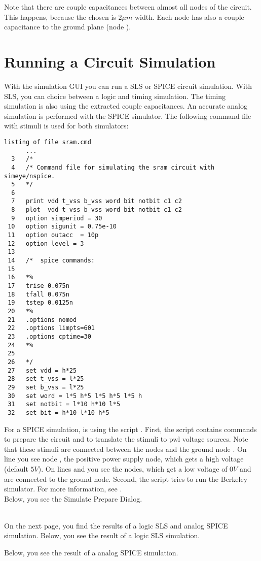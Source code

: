 Note that there are couple capacitances between almost all nodes of the circuit.
This happens, because the chosen  is $2 \mu m$ width.
Each node has also a couple capacitance to the ground plane (node ).

\section{Running a Circuit Simulation}
With the simulation GUI  you can run a SLS or SPICE circuit simulation.
With SLS, you can choice between a logic and timing simulation.
The timing simulation is also using the extracted couple capacitances.
An accurate analog simulation is performed with the SPICE simulator.
The following command file with stimuli is used for both simulators:

\small \begin{Verbatim}[frame=single]
listing of file sram.cmd
      ...
  3   /*
  4   /* Command file for simulating the sram circuit with simeye/nspice.
  5   */
  6
  7   print vdd t_vss b_vss word bit notbit c1 c2
  8   plot  vdd t_vss b_vss word bit notbit c1 c2
  9   option simperiod = 30
 10   option sigunit = 0.75e-10
 11   option outacc  = 10p
 12   option level = 3
 13
 14   /*  spice commands:
 15
 16   *%
 17   trise 0.075n
 18   tfall 0.075n
 19   tstep 0.0125n
 20   *%
 21   .options nomod
 22   .options limpts=601
 23   .options cptime=30
 24   *%
 25
 26   */
 27   set vdd = h*25
 28   set t_vss = l*25
 29   set b_vss = l*25
 30   set word = l*5 h*5 l*5 h*5 l*5 h
 31   set notbit = l*10 h*10 l*5
 32   set bit = h*10 l*10 h*5
\end{Verbatim}
\normalsize
For a SPICE simulation,  is using the script .
First, the script contains commands to prepare the circuit and to translate
the stimuli to pwl voltage sources.
Note that these stimuli are connected between the nodes and the ground node .
On line  you see node , the positive power supply node,
which gets a high voltage (default $5 V$).
On lines  and  you see the  nodes,
which get a low voltage of $0 V$ and are connected to the ground node.
Second, the script tries to run the Berkeley  simulator.
For more information, see .
\\[1 ex]
Below, you see the  Simulate Prepare Dialog.
\begin{figure}[h]
\centerline{}
\end{figure}
\\[1 ex]
On the next page, you find the results of a logic SLS and analog SPICE simulation.
\newpage
Below, you see the result of a logic SLS simulation.
\begin{figure}[h]
\centerline{}
\end{figure}

Below, you see the result of a analog SPICE simulation.
\begin{figure}[h]
\centerline{}
\end{figure}
